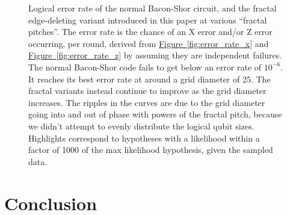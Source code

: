 \documentclass[onecolumn,unpublished,a4paper]{quantumarticle}
\theoremstyle{definition}
\theoremstyle{definition}
\theoremstyle{definition}
\newcommand{\fig}[1]{\hyperref[fig:#1]{Figure~\ref*{fig:#1}}}
\begin{document}
\begin{figure}[H]
    \centering
    \caption{
        Logical error rate of the normal Bacon-Shor circuit, and the fractal edge-deleting variant introduced in this paper at various ``fractal pitches''.
        The error rate is the chance of an X error and/or Z error occurring, per round, derived from \fig{error_rate_x} and \fig{error_rate_z} by assuming they are independent failures.
        The normal Bacon-Shor code fails to get below an error rate of $10^{-6}$.
        It reaches its best error rate at around a grid diameter of 25.
        The fractal variants instead continue to improve as the grid diameter increases.
        The ripples in the curves are due to the grid diameter going into and out of phase with powers of the fractal pitch, because we didn't attempt to evenly distribute the logical qubit sizes.
        Highlights correspond to hypotheses with a likelihood within a factor of 1000 of the max likelihood hypothesis, given the sampled data.
    }
    \label{fig:error_rate}
\end{figure}


\section{Conclusion}
\label{sec:conclusion}
\end{document}
